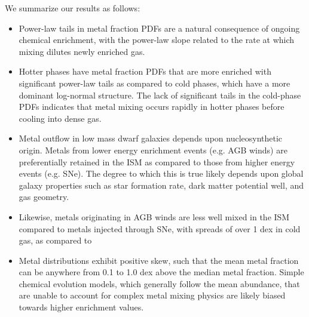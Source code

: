 \documentclass[twocolumn]{aastex61}
\begin{document}
We summarize our results as follows:
\begin{itemize}



\item Power-law tails in metal fraction PDFs are a natural consequence of ongoing chemical enrichment, with the power-law slope related to the rate at which mixing dilutes newly enriched gas.

\item Hotter phases have metal fraction PDFs that are more enriched with significant power-law tails as compared to cold phases, which have a more dominant log-normal structure. The lack of significant tails in the cold-phase PDFs indicates that metal mixing occurs rapidly in hotter phases before cooling into dense gas. %

\item Metal outflow in low mass dwarf galaxies depends upon nucleosynthetic origin. Metals from lower energy enrichment events (e.g. AGB winds) are preferentially retained in the ISM as compared to those from higher energy events (e.g. SNe). The degree to which this is true likely depends upon global galaxy properties such as star formation rate, dark matter potential well, and gas geometry.

\item Likewise, metals originating in AGB winds are less well mixed in the ISM compared to metals injected through SNe, with spreads of over 1 dex in cold gas, as compared to

\item Metal distributions exhibit positive skew, such that the mean metal fraction can be anywhere from 0.1 to 1.0 dex above the median metal fraction. Simple chemical evolution models, which generally follow the mean abundance, that are unable to account for complex metal mixing physics are likely biased towards higher enrichment values.


\end{itemize}
\end{document}
